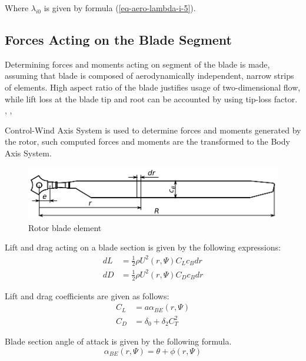 Where $\lambda_{i0}$ is given by formula (\ref{eq-aero-lambda-i-5}).

\subsection{Forces Acting on the Blade Segment}

Determining forces and moments acting on segment of the blade is made, assuming that blade is composed of aerodynamically independent, narrow strips of elements. \cite{Stepniewski1984} High aspect ratio of the blade justifies usage of two-dimensional flow, while lift loss at the blade tip and root can be accounted by using tip-loss factor. \cite{Padfield2007}, \cite{Stepniewski1984}, \cite{Bramwell2001}

Control-Wind Axis System is used to determine forces and moments generated by the rotor, such computed forces and moments are the transformed to the Body Axis System.

\begin{figure}[h!]
  \centering
  \includegraphics[width=120mm]{images/blade_element_theory_01.eps}
  \caption{Rotor blade element}
\end{figure}

Lift and drag acting on a blade section is given by the following expressions:
\begin{align}
  \label{eq-aero-blade-section-lift}
  dL &= \frac{1}{2} \rho U^2 \left( r, \Psi \right) C_L c_B dr \\
  \label{eq-aero-blade-section-drag}
  dD &= \frac{1}{2} \rho U^2 \left( r, \Psi \right) C_D c_B dr
\end{align}

Lift and drag coefficients are given as follows: \cite{Padfield2007}
\begin{align}
  \label{eq-aero-blade-section-lift-coef}
  C_L &= a \alpha_{BE} \left( r, \Psi \right) \\
  C_D &= \delta_0 + \delta_2 C_T^2
\end{align}

Blade section angle of attack is given by the following formula.
\begin{equation}
  \alpha_{BE} \left( r , \Psi \right) = \theta + \phi \left( r , \Psi \right) 
\end{equation}

